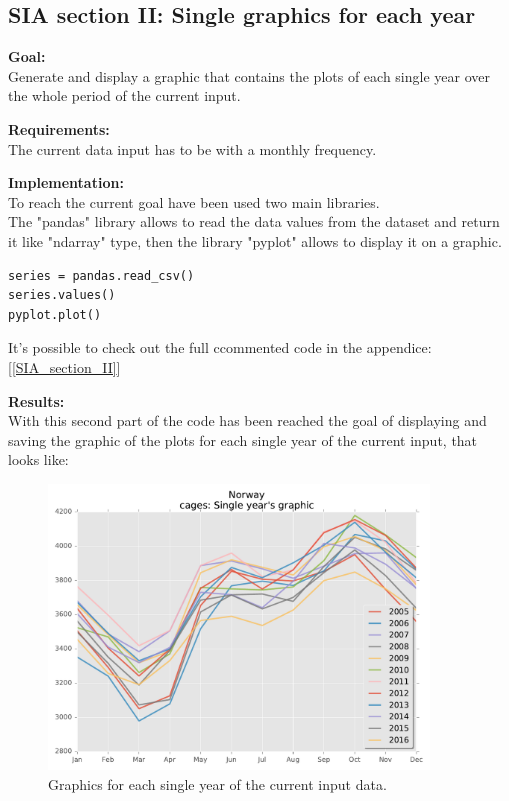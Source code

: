 \newpage
\subsection{SIA section II: Single graphics for each year}

\textbf{Goal:}\\
Generate and display a graphic that contains the plots of each single year over the whole period of the current input. 

\textbf{Requirements:}\\
The current data input has to be with a monthly frequency. 

\textbf{Implementation:}\\
To reach the current goal have been used two main libraries.\\
The "pandas" library allows to read the data values from the dataset and return it like "ndarray" type, then the library "pyplot" allows to display it on a graphic.
\begin{lstlisting}
series = pandas.read_csv()
series.values()
pyplot.plot()
\end{lstlisting}

It's possible to check out the full ccommented code in the appendice: [\ref{SIA_section_II}]

\textbf{Results:} \\
With this second part of the code has been reached the goal of displaying and saving the graphic of the plots for each single year of the current input, that looks like:
\begin{figure}[H]
	\centering
    \includegraphics[width=0.9\textwidth]{Files/Cages_Years.pdf}
    \caption{Graphics for each single year of the current input data.}
\end{figure}




